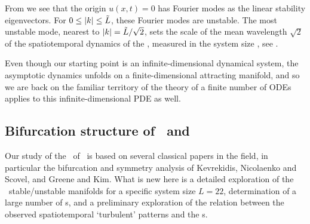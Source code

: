 From  we see that the origin $u(x,t) = 0$
has Fourier modes as the  linear
stability eigenvectors.
For $0 \leq |k| \leq \tilde{L}$, these Fourier modes are
unstable.
The most unstable mode, nearest to $|k|=\tilde{L}/\sqrt{2}$,
sets the scale of the mean wavelength $\sqrt{2}$
of the spatiotemporal dynamics of the {\KSe},
measured in the system size \tildeL, see .


%
%

Even though our starting point
is an infinite-dimensional dynamical system, the asymptotic dynamics
unfolds on a finite-dimensional attracting manifold, and so we are back on
the familiar territory of
the theory of a finite number of ODEs applies to this
infinite-dimensional PDE as well.

\subsection{Bifurcation structure of \eqva\ and \reqva}%
\label{sec:KSlit}
%

Our study of the \eqva\ of
\KSe\ is based on several classical papers in the field,
in particular the bifurcation and symmetry analysis of
Kevrekidis, Nicolaenko and Scovel,
and Greene and Kim. What is new here is
a detailed exploration of the \eqva\ stable/unstable manifolds
for a specific system size $L = 22$, determination
of a large number of \rpo s, and a preliminary
exploration of the relation between the
observed spatiotemporal `turbulent' patterns and
the \rpo s.


